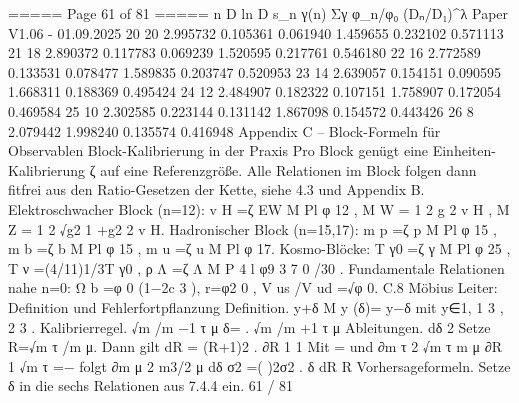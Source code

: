 \begin{MyVerbatim}
{{===== Page 61 of 81 =====
n D ln D s_n γ(n) Σγ φ_n/φ₀ (Dₙ/D₁)^λ
Paper V1.06 - 01.09.2025
20 20 2.995732 0.105361 0.061940 1.459655 0.232102 0.571113
21 18 2.890372 0.117783 0.069239 1.520595 0.217761 0.546180
22 16 2.772589 0.133531 0.078477 1.589835 0.203747 0.520953
23 14 2.639057 0.154151 0.090595 1.668311 0.188369 0.495424
24 12 2.484907 0.182322 0.107151 1.758907 0.172054 0.469584
25 10 2.302585 0.223144 0.131142 1.867098 0.154572 0.443426
26 8 2.079442 1.998240 0.135574 0.416948
Appendix C – Block-Formeln für Observablen
Block-Kalibrierung in der Praxis
Pro Block genügt eine Einheiten-Kalibrierung ζ auf eine Referenzgröße. Alle Relationen im Block folgen dann fitfrei
aus den Ratio-Gesetzen der Kette, siehe 4.3 und Appendix B.
Elektroschwacher Block (n=12):
v H =ζ EW M Pl φ 12 , M W = 1 2 g 2 v H , M Z = 1 2 √g2 1 +g2 2 v H.
Hadronischer Block (n=15,17):
m p =ζ p M Pl φ 15 , m b =ζ b M Pl φ 15 , m u =ζ u M Pl φ 17.
Kosmo-Blöcke:
T γ0 =ζ γ M Pl φ 25 , T ν =(4/11)1/3T γ0 , ρ Λ =ζ Λ M P 4 l φ9 3 7 0 /30 .
Fundamentale Relationen nahe n=0:
Ω b =φ 0 (1−2c 3 ), r=φ2 0 , V us /V ud =√φ 0.
C.8 Möbius Leiter: Definition und Fehlerfortpflanzung
Definition.
y+δ
M y (δ)= y−δ mit y∈{1, 1 3 , 2 3 }.
Kalibrierregel.
√m /m −1
τ μ
δ= .
√m /m +1
τ μ
Ableitungen.
dδ 2
Setze R=√m τ /m μ. Dann gilt dR = (R+1)2 .
∂R 1 1
Mit = und
∂m
τ
2 √m
τ
m
μ
∂R 1 √m
τ
=− folgt
∂m
μ
2 m3/2
μ
dδ
σ2 =( )2σ2 .
δ dR R
Vorhersageformeln.
Setze δ in die sechs Relationen aus 7.4.4 ein.
61 / 81

}}
\end{MyVerbatim}
